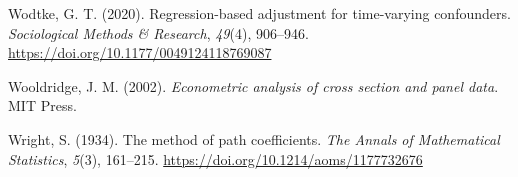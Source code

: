 \documentclass[
  11pt,
  a4paper,
]{article}
\newlength{\cslhangindent}
\newenvironment{CSLReferences}[2] %
 {\begin{list}{}{%
  \setlength{\itemindent}{0pt}
  \setlength{\leftmargin}{0pt}
  \setlength{\parsep}{0pt}
  \ifodd #1
   \setlength{\leftmargin}{\cslhangindent}
   \setlength{\itemindent}{-1\cslhangindent}
  \fi
  \setlength{\itemsep}{#2\baselineskip}}}
 {\end{list}}
\begin{document}
\begin{CSLReferences}{1}{0}
Wodtke, G. T. (2020). Regression-based adjustment for time-varying
confounders. \emph{Sociological Methods \& Research}, \emph{49}(4),
906--946. \url{https://doi.org/10.1177/0049124118769087}

Wooldridge, J. M. (2002). \emph{Econometric analysis of cross section
and panel data}. MIT Press.

Wright, S. (1934). The method of path coefficients. \emph{The Annals of
Mathematical Statistics}, \emph{5}(3), 161--215.
\url{https://doi.org/10.1214/aoms/1177732676}

\end{CSLReferences}
\end{document}
